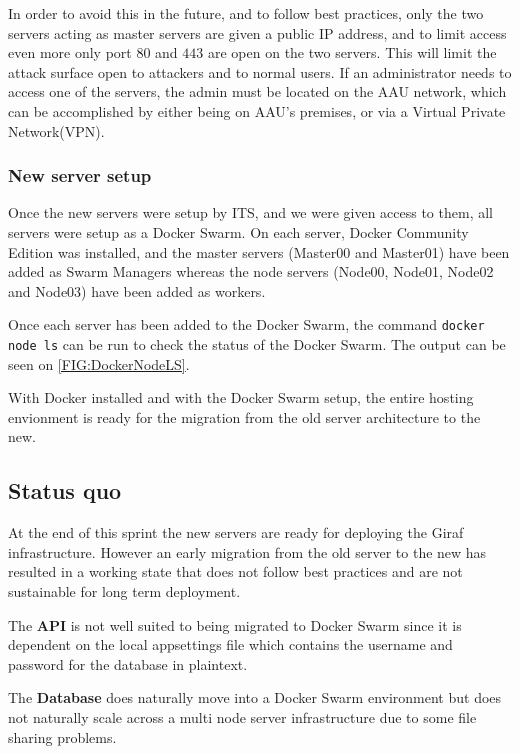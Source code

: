 In order to avoid this in the future, and to follow best practices, only the two servers acting as master servers are given a public IP address, and to limit access even more only port $80$ and $443$ are open on the two servers. 
This will limit the attack surface open to attackers and to normal users. 
If an administrator needs to access one of the servers, the admin must be located on the AAU network, which can be accomplished by either being on AAU's premises, or via a Virtual Private Network(VPN).

\subsubsection{New server setup}

Once the new servers were setup by ITS, and we were given access to them, all servers were setup as a Docker Swarm. 
On each server, Docker Community Edition was installed, and the master servers (Master00 and Master01) have been added as Swarm Managers whereas the node servers (Node00, Node01, Node02 and Node03) have been added as workers. 

Once each server has been added to the Docker Swarm, the command \lstinline[columns=fixed]{docker node ls} can be run to check the status of the Docker Swarm.
The output can be seen on \autoref{FIG:DockerNodeLS}.

With Docker installed and with the Docker Swarm setup, the entire hosting envionment is ready for the migration from the old server architecture to the new.

\subsection{Status quo}
At the end of this sprint the new servers are ready for deploying the Giraf infrastructure. 
However an early migration from the old server to the new has resulted in a working state that does not follow best practices and are not sustainable for long term deployment. 

The \textbf{API} is not well suited to being migrated to Docker Swarm since it is dependent on the local appsettings file which contains the username and password for the database in plaintext. 

The \textbf{Database} does naturally move into a Docker Swarm environment but does not naturally scale across a multi node server infrastructure due to some file sharing problems. 

